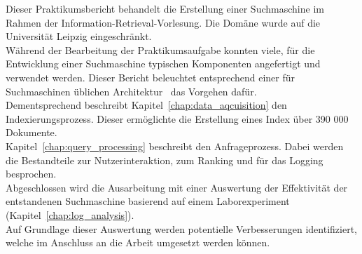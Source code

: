 Dieser Praktikumsbericht behandelt die Erstellung einer Suchmaschine im Rahmen der Information-Retrieval-Vorlesung.
Die Domäne wurde auf die Universität Leipzig eingeschränkt.\\
Während der Bearbeitung der Praktikumsaufgabe konnten viele, für die Entwicklung einer Suchmaschine
typischen Komponenten angefertigt und verwendet werden.
Dieser Bericht beleuchtet entsprechend einer für Suchmaschinen üblichen Architektur~\cite{croft.chap2} das
Vorgehen dafür.\\
Dementsprechend beschreibt Kapitel~\ref{chap:data_aqcuisition} den Indexierungsprozess.
Dieser ermöglichte die Erstellung eines Index über 390 000 Dokumente.\\
Kapitel~\ref{chap:query_processing} beschreibt den Anfrageprozess.
Dabei werden die Bestandteile zur Nutzerinteraktion, zum Ranking und für das Logging besprochen.\\
Abgeschlossen wird die Ausarbeitung mit einer Auswertung
der Effektivität der entstandenen Suchmaschine basierend auf einem Laborexperiment (Kapitel~\ref{chap:log_analysis}).\\
Auf Grundlage dieser Auswertung werden potentielle Verbesserungen identifiziert, welche im Anschluss an die Arbeit umgesetzt
werden können.

